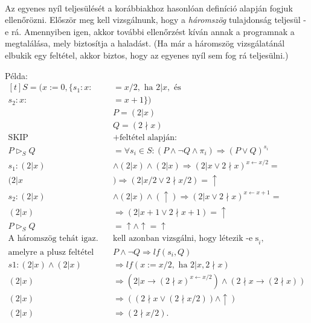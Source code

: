 \documentclass[12pt]{article}
\begin{document}
	\paragraph{}
	Az egyenes nyíl teljesülését a korábbiakhoz hasonlóan definíció alapján fogjuk ellenőrözni. Először meg kell vizsgálnunk, hogy a \textit{háromszög} tulajdonság teljesül -e rá. Amennyiben igen, akkor további ellenőrzést kíván annak a programnak a megtalálása, mely biztosítja a haladást. (Ha már a háromszög vizsgálatánál elbukik egy feltétel, akkor biztos, hogy az egyenes nyíl sem fog rá teljesülni.)
	
	Példa:
	$
	\begin{aligned}[t]
	S = (x:=0, \{s_1: x :&= x/2, \text{ ha } 2|x, \text{ és}\\
	s_2: x :&= x+1\})\\
	&P = (2|x)\\
	&Q = (2\nmid x)\\
	\text{SKIP} &+ \text{feltétel alapján: }\\
	P \vartriangleright_S Q &=\forall s_i \in S: (P \land \neg Q \land \pi_i) \Rightarrow (P \lor Q)^{s_i}\\
	s_1: (2|x) &\land (2|x) \land (2|x) \Rightarrow (2|x \lor 2\nmid x)^{x \leftarrow x/2} = \\
	(2|x &) \Rightarrow (2|x/2 \lor 2\nmid x/2) = \uparrow \\
	s_2: (2|x) &\land (2|x) \land (\uparrow) \Rightarrow (2|x \lor 2\nmid x)^{x \leftarrow x+1} = \\
	(2|x) &\Rightarrow (2|x+1 \lor 2\nmid x+1) = \uparrow\\
	P \vartriangleright_S Q &= \uparrow \land \uparrow = \uparrow\\
	\text{A háromszög tehát igaz. Meg } & \text{kell azonban vizsgálni, hogy létezik -e s}_i,\\
	\text{amelyre a plusz feltétel teljesül: }& P\land \neg Q \Rightarrow lf(s_i, Q)\\
	s1: (2|x) \land (2|x) &\Rightarrow lf(x:=x/2, \text{ ha } 2|x, 2\nmid x)\\
	(2|x) &\Rightarrow (2|x \rightarrow (2\nmid x)^{x\leftarrow x/2}) \land (2\nmid x \rightarrow (2\nmid x))\\
	(2|x) &\Rightarrow ((2\nmid x \lor (2\nmid x/2)) \land \uparrow)\\
	(2|x) &\Rightarrow (2 \nmid x/2).\\
	\end{aligned}
	$
	
\end{document}
